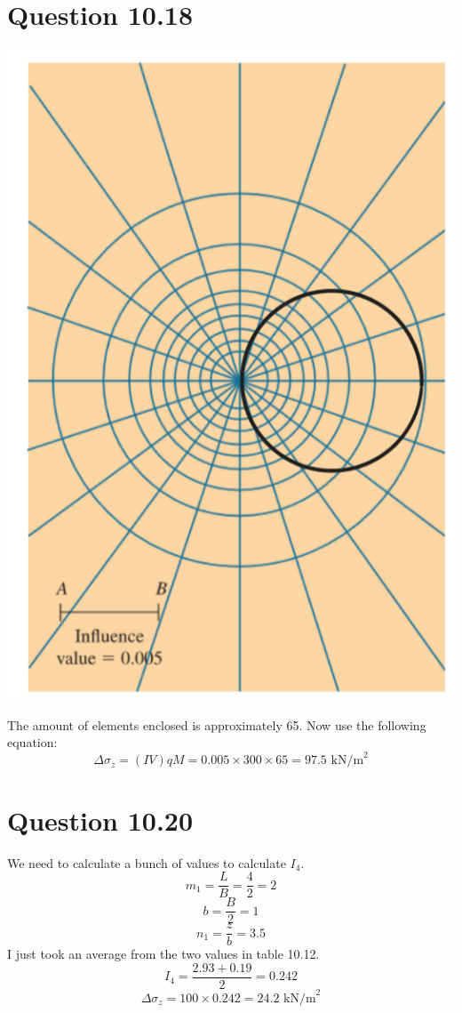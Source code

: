 \documentclass{article}
\begin{document}
\section*{Question 10.18}
\begin{center}
    \includegraphics*[scale=0.4]{fig2.png} 
\end{center}
The amount of elements enclosed is approximately 65. Now use the following equation: 
\[\Delta\sigma_z=(IV)qM=0.005\times 300\times 65=\boxed{97.5\text{ kN/m}^2}\]
\newpage
\section*{Question 10.20}
We need to calculate a bunch of values to calculate $I_4$.
\[m_1=\frac{L}{B}=\frac{4}{2}=2\] 
\[b=\frac{B}{2}=1\]
\[n_1=\frac{z}{b}=3.5\]
I just took an average from the two values in table 10.12. 
\[I_4=\frac{2.93+0.19}{2}=0.242\] 
\[\Delta\sigma_z=100\times0.242=\boxed{24.2\text{ kN/m}^2}\]
\end{document}
